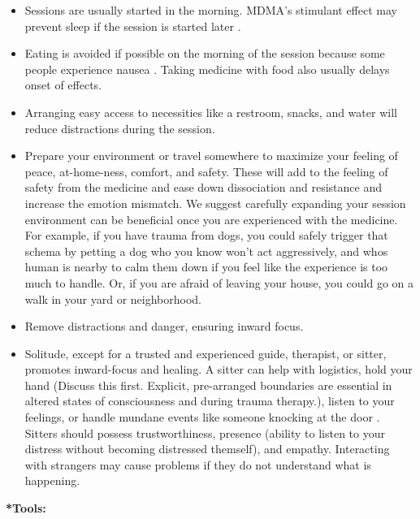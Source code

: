 \documentclass[12pt,letterpaper]{article}
\begin{document}
\begin{itemize}
    \item Sessions are usually started in the morning. MDMA's stimulant effect may prevent sleep if the session is started later \cite{berro2018acute}.
    \item Eating is avoided if possible on the morning of the session because some people experience nausea \cite{mithoeferManual}. Taking medicine with food also usually delays onset of effects.
    \item Arranging easy access to necessities like a restroom, snacks, and water will reduce distractions during the session.
    \label{contextexpansion}
    \item Prepare your environment or travel somewhere to maximize your feeling of peace, at-home-ness, comfort, and safety. These will add to the feeling of safety from the medicine and ease down dissociation and resistance and increase the emotion mismatch. We suggest carefully expanding your session environment can be beneficial once you are experienced with the medicine. For example, if you have trauma from dogs, you could safely trigger that schema by petting a dog who you know won't act aggressively, and whos human is nearby to calm them down if you feel like the experience is too much to handle. Or, if you are afraid of leaving your house, you could go on a walk in your yard or neighborhood.
    \item Remove distractions and danger, ensuring inward focus. 
    \item Solitude, except for a trusted and experienced guide, therapist, or sitter, promotes inward-focus and healing. A sitter can help with logistics, hold your hand (Discuss this first. Explicit, pre-arranged boundaries are essential in altered states of consciousness and during trauma therapy.), listen to your feelings, or handle mundane events like someone knocking at the door \cite{mithoeferManual,thalSitter}. Sitters should possess trustworthiness, presence (ability to listen to your distress without becoming distressed themself), and empathy. Interacting with strangers may cause problems if they do not understand what is happening. 
\end{itemize}
\noindent \textbf{*Tools:}
\end{document}
